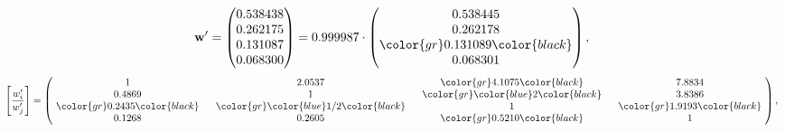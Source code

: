 \begin{example}
\begin{equation*}
\mathbf{w}^{\prime} =
\begin{pmatrix}
0.538438\\
0.262175\\
0.131087\\
0.068300
\end{pmatrix} =
0.999987\cdot
\begin{pmatrix}
0.538445\\
0.262178\\
\color{gr} 0.131089\color{black} \\
0.068301
\end{pmatrix},
\end{equation*}
\begin{equation*}
\left[ \frac{{w}^{\prime}_i}{{w}^{\prime}_j} \right] =
\begin{pmatrix}
$\,\,$ 1 $\,\,$ & $\,\,$2.0537$\,\,$ & $\,\,$\color{gr} 4.1075\color{black} $\,\,$ & $\,\,$7.8834$\,\,$ \\
$\,\,$0.4869$\,\,$ & $\,\,$ 1 $\,\,$ & $\,\,$\color{gr} \color{blue} 2\color{black} $\,\,$ & $\,\,$3.8386  $\,\,$ \\
$\,\,$\color{gr} 0.2435\color{black} $\,\,$ & $\,\,$\color{gr} \color{blue}  1/2\color{black} $\,\,$ & $\,\,$ 1 $\,\,$ & $\,\,$\color{gr} 1.9193\color{black}  $\,\,$ \\
$\,\,$0.1268$\,\,$ & $\,\,$0.2605$\,\,$ & $\,\,$\color{gr} 0.5210\color{black} $\,\,$ & $\,\,$ 1  $\,\,$ \\
\end{pmatrix},
\end{equation*}
\end{example}
\newpage
